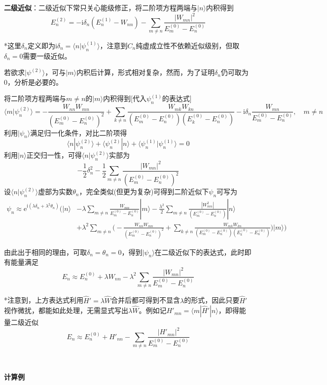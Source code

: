 \documentclass[a4paper,UTF8,fontset=windows]{ctexart}
\newcommand*{\ir}{\mathrm{i}}
\newcommand*{\er}{\mathrm{e}}
\newcommand*{\ket}[1]{|#1\rangle}
\newcommand*{\bk}[2]{\langle#1|#2\rangle}
\newcommand*{\blk}[3]{\langle#1|#2|#3\rangle}
\begin{document}
\textbf{二级近似}：二级近似下常只关心能级修正，将二阶项方程两端与$\ket{n}$内积得到
$$E_n^{(2)}=-\ir\delta_n(E_n^{(1)}-W_{nn})-\sum_{m\ne n}\frac{|W_{mn}|^2}{E_m^{(0)}-E_n^{(0)}}$$

*这里$\delta_n$定义即为$\ir\delta_n=\bk{n}{\psi_n^{(1)}}$，注意到$C_n$纯虚成立性不依赖近似级别，但取$\delta_n=0$需要一级近似。

若欲求$\ket{\psi^{(2)}}$，可与$\ket{m}$内积后计算，形式相对复杂，然而，为了证明$\delta_n$仍可取为0，分析是必要的。

将二阶项方程两端与$m\ne n$的$\ket{m}$内积得到[代入$\psi_n^{(1)}$的表达式]
$$\bk{m}{\psi_n^{(2)}}=-\frac{W_{nn}W_{mn}}{(E_m^{(0)}-E_n^{(0)})^2}+\sum_{k\ne n}\frac{W_{mk}W_{kn}}{(E_m^{(0)}-E_n^{(0)})(E_k^{(0)}-E_n^{(0)})}-\ir\delta_n\frac{W_{mn}}{E_m^{(0)}-E_n^{(0)}},\quad m\ne n$$
利用$\ket{\psi_n}$满足归一化条件，对比二阶项得
$$\bk{n}{\psi_n^{(2)}}+\bk{\psi_n^{(2)}}{n}+\bk{\psi_n^{(1)}}{\psi_n^{(1)}}=0$$
利用$\ket{n}$正交归一性，可得$\bk{n}{\psi_n^{(2)}}$实部为
$$-\frac{1}{2}\delta_n^2-\frac{1}{2}\sum_{m\ne n}\frac{|W_{mn}|^2}{(E_m^{(0)}-E_n^{(0)})^2}$$
设$\bk{n}{\psi_n^{(2)}}$虚部为实数$\theta_n$，完全类似(但更为复杂)可得到二阶近似下$\psi_n$可写为
$$\begin{aligned}\psi_n\approx\er^{\ir(\lambda\delta_n+\lambda^2\theta_n)}\bigg(\ket{n}&-\lambda\sum_{m\ne n}\frac{W_{mn}}{E_m^{(0)}-E_n^{(0)}}\ket{m}-\frac{\lambda^2}{2}\sum_{m\ne n}\frac{|W_{mn}^2|}{(E_m^{(0)}-E_n^{(0)})}\ket{n}\\ &+\lambda^2\sum_{m\ne n}\bigg(-\frac{W_{nn}W_{mn}}{(E_m^{(0)}-E_n^{(0)})^2}+\sum_{k\ne n}\frac{W_{mk}W_{kn}}{(E_m^{(0)}-E_n^{(0)})(E_k^{(0)}-E_n^{(0)})}\bigg)\ket{m}\bigg)\end{aligned}$$

由此出于相同的理由，可取$\delta_n=\theta_n=0$，得到$\ket{\psi_n}$在二级近似下的表达式，此时即有能量满足
$$E_n\approx E_n^{(0)}+\lambda W_{nn}-\lambda^2\sum_{m\ne n}\frac{|W_{mn}|^2}{E_m^{(0)}-E_n^{(0)}}$$

*注意到，上方表达式利用$\hat{H}'=\lambda\hat{W}$合并后都可得到不显含$\lambda$的形式，因此只要$\hat{H}'$视作微扰，都能如此处理，无需显式写出$\lambda\hat{W}$。例如记$H'_{mn}=\blk{m}{\hat{H}'}{n}$，即得能量二级近似
$$E_n\approx E_n^{(0)}+H'_{nn}-\sum_{m\ne n}\frac{|H'_{mn}|^2}{E_m^{(0)}-E_n^{(0)}}$$

\

\textbf{计算例}
\end{document}
